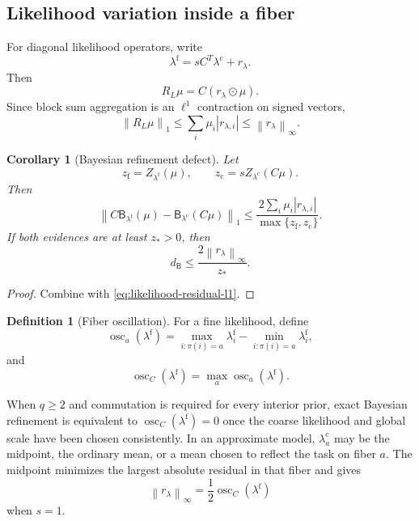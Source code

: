 \documentclass[11pt]{article}
\newtheorem{corollary}[theorem]{Corollary}
\theoremstyle{definition}
\newtheorem{definition}[theorem]{Definition}
\theoremstyle{remark}
\newcommand{\osc}{\operatorname{osc}}
\newcommand{\norm}[1]{\left\lVert #1\right\rVert}
\newcommand{\abs}[1]{\left\lvert #1\right\rvert}
\newcommand{\fine}{\mathrm f}
\newcommand{\coarse}{\mathrm c}
\newcommand{\Bup}{\mathsf B}
\begin{document}
\subsection{Likelihood variation inside a fiber}
For diagonal likelihood operators, write
\begin{equation}\label{eq:likelihood-residual}
  \lambda^{\fine}
  =
  sC^T\lambda^{\coarse}+r_{\lambda}.
\end{equation}
Then
\[
  R_L\mu=C(r_{\lambda}\odot\mu).
\]
Since block sum aggregation is an $\ell^1$ contraction on signed vectors,
\begin{equation}\label{eq:likelihood-residual-l1}
  \norm{R_L\mu}_1
  \leq
  \sum_i\mu_i\abs{r_{\lambda,i}}
  \leq
  \norm{r_{\lambda}}_{\infty}.
\end{equation}

\begin{corollary}[Bayesian refinement defect]\label{cor:bayes-refinement-defect}
Let
\[
  z_{\fine}=Z_{\lambda^{\fine}}(\mu),
  \qquad
  z_{\coarse}=sZ_{\lambda^{\coarse}}(C\mu).
\]
Then
\begin{equation}\label{eq:bayes-refinement-defect}
  \boxed{
  \norm{
  C\Bup_{\lambda^{\fine}}(\mu)
  -
  \Bup_{\lambda^{\coarse}}(C\mu)
  }_1
  \leq
  \frac{2\sum_i\mu_i\abs{r_{\lambda,i}}}
  {\max\{z_{\fine},z_{\coarse}\}}.}
\end{equation}
If both evidences are at least $z_*>0$, then
\begin{equation}\label{eq:bayes-refinement-uniform}
  d_{\Bup}
  \leq
  \frac{2\norm{r_{\lambda}}_{\infty}}{z_*}.
\end{equation}
\end{corollary}

\begin{proof}
Combine  with \eqref{eq:likelihood-residual-l1}.
\end{proof}

\begin{definition}[Fiber oscillation]\label{def:fiber-oscillation}
For a fine likelihood, define
\[
  \osc_a(\lambda^{\fine})
  =
  \max_{i:\pi(i)=a}\lambda_i^{\fine}
  -
  \min_{i:\pi(i)=a}\lambda_i^{\fine},
\]
and
\[
  \osc_C(\lambda^{\fine})
  =\max_a\osc_a(\lambda^{\fine}).
\]
\end{definition}

When $q\geq2$ and commutation is required for every interior prior, exact Bayesian refinement is equivalent to $\osc_C(\lambda^{\fine})=0$ once the coarse likelihood and global scale have been chosen consistently.  In an approximate model, $\lambda_a^{\coarse}$ may be the midpoint, the ordinary mean, or a mean chosen to reflect the task on fiber $a$.  The midpoint minimizes the largest absolute residual in that fiber and gives
\[
  \norm{r_{\lambda}}_{\infty}
  =\frac12\osc_C(\lambda^{\fine})
\]
when $s=1$.
\end{document}
